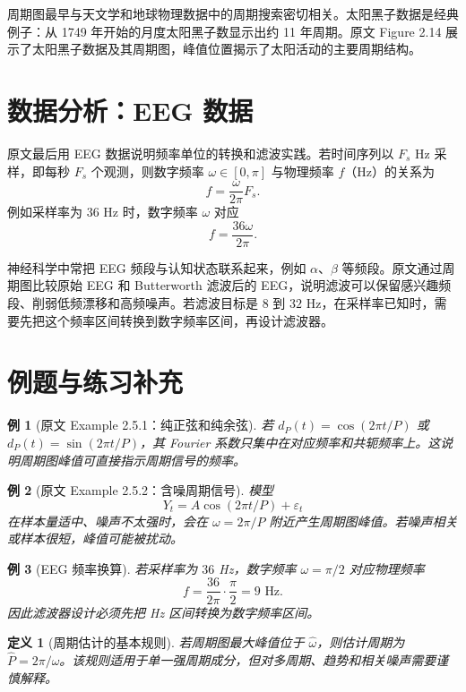 \documentclass[11pt,a4paper]{ctexart}
\newtheorem{definition}{定义}[section]
\newtheorem{example}{例}[section]
\begin{document}
周期图最早与天文学和地球物理数据中的周期搜索密切相关。太阳黑子数据是经典例子：从 1749 年开始的月度太阳黑子数显示出约 11 年周期。原文 Figure 2.14 展示了太阳黑子数据及其周期图，峰值位置揭示了太阳活动的主要周期结构。

\section{数据分析：EEG 数据}

原文最后用 EEG 数据说明频率单位的转换和滤波实践。若时间序列以 \(F_s\) Hz 采样，即每秒 \(F_s\) 个观测，则数字频率 \(\omega\in[0,\pi]\) 与物理频率 \(f\)（Hz）的关系为
\[
  f=\frac{\omega}{2\pi}F_s.
\]
例如采样率为 \(36\) Hz 时，数字频率 \(\omega\) 对应
\[
  f=\frac{36\omega}{2\pi}.
\]

神经科学中常把 EEG 频段与认知状态联系起来，例如 \(\alpha\)、\(\beta\) 等频段。原文通过周期图比较原始 EEG 和 Butterworth 滤波后的 EEG，说明滤波可以保留感兴趣频段、削弱低频漂移和高频噪声。若滤波目标是 \(8\) 到 \(32\) Hz，在采样率已知时，需要先把这个频率区间转换到数字频率区间，再设计滤波器。

\section{例题与练习补充}

\begin{example}[原文 Example 2.5.1：纯正弦和纯余弦]
若 \(d_P(t)=\cos(2\pi t/P)\) 或 \(d_P(t)=\sin(2\pi t/P)\)，其 Fourier 系数只集中在对应频率和共轭频率上。这说明周期图峰值可直接指示周期信号的频率。
\end{example}

\begin{example}[原文 Example 2.5.2：含噪周期信号]
模型
\[
  Y_t=A\cos(2\pi t/P)+\varepsilon_t
\]
在样本量适中、噪声不太强时，会在 \(\omega=2\pi/P\) 附近产生周期图峰值。若噪声相关或样本很短，峰值可能被扰动。
\end{example}

\begin{example}[EEG 频率换算]
若采样率为 \(36\) Hz，数字频率 \(\omega=\pi/2\) 对应物理频率
\[
  f=\frac{36}{2\pi}\cdot\frac{\pi}{2}=9\text{ Hz}.
\]
因此滤波器设计必须先把 Hz 区间转换为数字频率区间。
\end{example}

\begin{definition}[周期估计的基本规则]
若周期图最大峰值位于 \(\hat\omega\)，则估计周期为 \(\hat P=2\pi/\hat\omega\)。该规则适用于单一强周期成分，但对多周期、趋势和相关噪声需要谨慎解释。
\end{definition}
\end{document}
